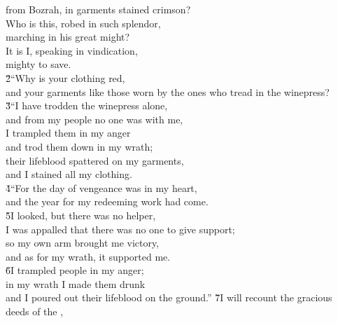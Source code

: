 \begin{poetry}
\poemll    from Bozrah, in garments stained crimson? \\
\poeml Who is this, robed in such splendor, \\
\poemll    marching in his great might? \\
\poeml It is I, speaking in vindication, \\
\poemll    mighty to save. \\
\poeml \v{2}``Why is your clothing red, \\
\poemll    and your garments like those worn by the ones who tread in the winepress? \\
\poeml \v{3}``I have trodden the winepress alone, \\
\poemll    and from my people no one was with me, \\
\poeml I trampled them in my anger \\
\poemll    and trod them down in my wrath; \\
\poeml their lifeblood spattered on my garments, \\
\poemll    and I stained all my clothing. \\
\poeml \v{4}``For the day of vengeance was in my heart, \\
\poemll    and the year for my redeeming work had come. \\
\poeml \v{5}I looked, but there was no helper, \\
\poemll    I was appalled that there was no one to give support; \\
\poeml so my own arm brought me victory, \\
\poemll    and as for my wrath, it supported me. \\
\poeml \v{6}I trampled people in my anger; \\
\poemll    in my wrath I made them drunk \\
\poemlll       and I poured out their lifeblood on the ground.''
\poeml \v{7}I will recount the gracious deeds of the , \\

\end{poetry}
